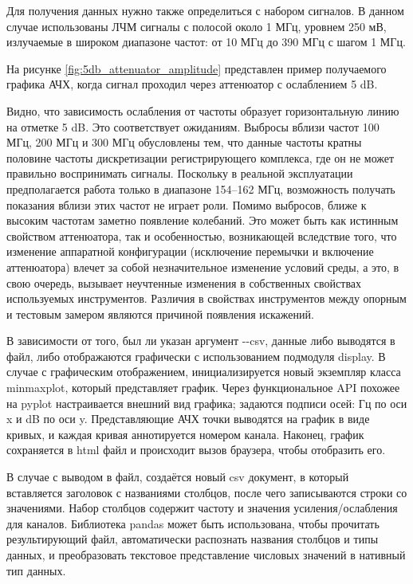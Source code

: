 \documentclass{report}
\begin{document}
Для получения данных нужно также определиться с набором сигналов. В данном случае использованы ЛЧМ сигналы с полосой около 1 МГц, уровнем 250 мВ, излучаемые в широком диапазоне частот: от 10 МГц до 390 МГц с шагом 1 МГц.

На рисунке \ref{fig:5db_attenuator_amplitude} представлен пример получаемого графика АЧХ, когда сигнал проходил через аттенюатор с ослаблением 5 dB.


Видно, что зависимость ослабления от частоты образует горизонтальную линию на отметке 5 dB. Это соответствует ожиданиям. Выбросы вблизи частот 100 МГц, 200 МГц и 300 МГц обусловлены тем, что данные частоты кратны половине частоты дискретизации регистрирующего комплекса, где он не может правильно воспринимать сигналы. Поскольку в реальной эксплуатации предполагается работа только в диапазоне 154--162 МГц, возможность получать показания вблизи этих частот не играет роли. Помимо выбросов, ближе к высоким частотам заметно появление колебаний. Это может быть как истинным свойством аттенюатора, так и особенностью, возникающей вследствие того, что изменение аппаратной конфигурации (исключение перемычки и включение аттенюатора) влечет за собой незначительное изменение условий среды, а это, в свою очередь, вызывает неучтенные изменения в собственных свойствах используемых инструментов. Различия в свойствах инструментов между опорным и тестовым замером являются причиной появления искажений.

В зависимости от того, был ли указан аргумент -{}-csv, данные либо выводятся в файл, либо отображаются графически с использованием подмодуля display. В случае с графическим отображением, инициализируется новый экземпляр класса minmaxplot, который представляет график. Через функциональное API похожее на pyplot настраивается внешний вид графика; задаются подписи осей: Гц по оси x и dB по оси y. Представляющие АЧХ точки выводятся на график в виде кривых, и каждая кривая аннотируется номером канала. Наконец, график сохраняется в html файл и происходит вызов браузера, чтобы отобразить его.

В случае с выводом в файл, создаётся новый csv документ, в который вставляется заголовок с названиями столбцов, после чего записываются строки со значениями. Набор столбцов содержит частоту и значения усиления/ослабления для каналов. Библиотека pandas может быть использована, чтобы прочитать результирующий файл, автоматически распознать названия столбцов и типы данных, и преобразовать текстовое представление числовых значений в нативный тип данных.
\end{document}
